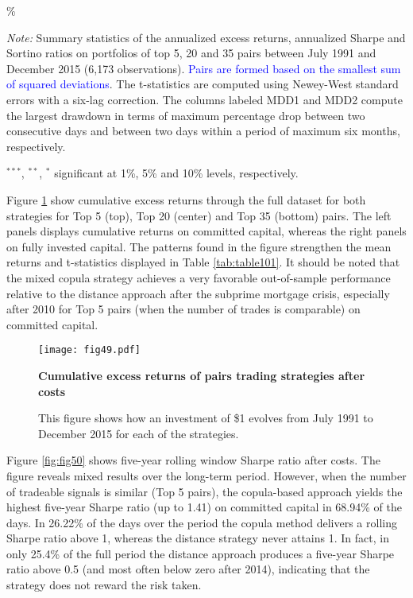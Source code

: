 \documentclass[a4paper]{article}
\begin{document}
\begin{threeparttable}[H]
\begin{tabularx}{\textwidth}{@{\extracolsep{\fill}}llllllll@{}}
		\bottomrule
	\end{tabularx}\%
	\begin{tablenotes}
		\item \textit{Note:} \scriptsize \tiny Summary statistics of the annualized excess returns, annualized Sharpe and Sortino ratios on portfolios of top 5, 20 and 35 pairs between July 1991 and December 2015 (6,173 observations). \textcolor{blue} {Pairs are formed based on the smallest sum of squared deviations}. The t-statistics are computed using Newey-West standard errors with a six-lag correction. The columns labeled MDD1 and MDD2 compute the largest drawdown in terms of maximum percentage drop between two consecutive days and between two days within a period of maximum six months, respectively.
		\item \scriptsize $^{\ast\ast\ast}$, $^{\ast\ast}$, $^{\ast}$  significant at 1\%, 5\% and 10\% levels, respectively.
	\end{tablenotes}
	\label{tab:table101}
\end{threeparttable}

\vspace{0.6cm}


Figure \ref{fig:fig49} show cumulative excess returns through the full dataset for both strategies for Top 5 (top), Top 20 (center) and Top 35 (bottom) pairs. The left panels displays cumulative returns on committed capital, whereas the right panels on fully invested capital. The patterns found in the figure strengthen the mean returns and t-statistics displayed in Table \ref{tab:table101}. It should be noted that the mixed copula strategy achieves a very favorable out-of-sample performance relative to the distance approach after the subprime mortgage crisis, especially after 2010 for Top 5 pairs (when the number of trades is comparable) on committed capital. 

\begin{figure}[H]
	\centering
	\texttt{[image: fig49.pdf]}
	\caption{\textbf{Cumulative excess returns of pairs trading strategies after costs}}
	\caption*{\scriptsize This figure shows how an investment of \$1 evolves from July 1991 to December 2015 for each of the strategies.}
	\label{fig:fig49}
\end{figure}

Figure \ref{fig:fig50} shows five-year rolling window Sharpe ratio after costs. The figure reveals mixed results over the long-term period. However, when the number of tradeable signals is similar (Top 5 pairs), the copula-based approach yields the highest five-year Sharpe ratio (up to 1.41) on committed capital in 68.94\% of the days. In 26.22\% of the days over the period the copula method delivers a rolling Sharpe ratio above 1, whereas the distance strategy never attains 1. In fact, in only 25.4\% of the full period the distance approach produces a five-year Sharpe ratio above 0.5 (and most often below zero after 2014), indicating that the strategy does not reward the risk taken.
\end{document}
